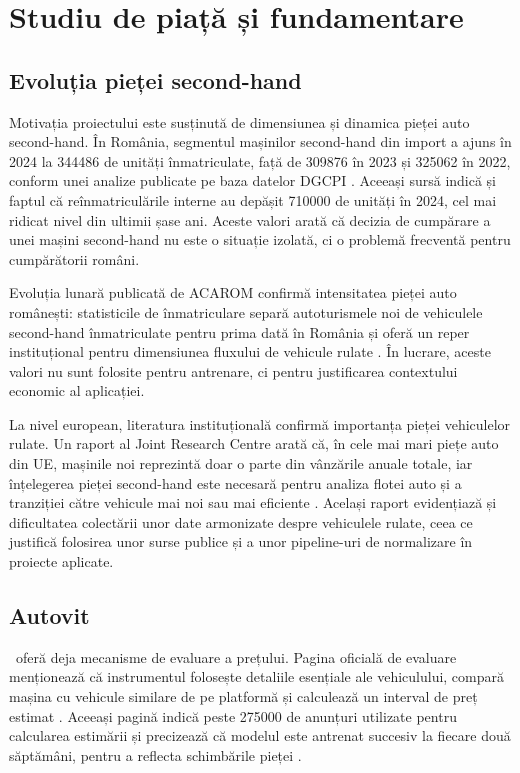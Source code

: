 \chapter{Studiu de piață și fundamentare}
\label{chapter:market}

\section{Evoluția pieței second-hand}
\label{sec:market-growth}

Motivația proiectului este susținută de dimensiunea și dinamica pieței auto second-hand. În România, segmentul mașinilor second-hand din import a ajuns în 2024 la 344486 de unități înmatriculate, față de 309876 în 2023 și 325062 în 2022, conform unei analize publicate pe baza datelor DGCPI \cite{revistabiz_auto_2024}. Aceeași sursă indică și faptul că reînmatriculările interne au depășit 710000 de unități în 2024, cel mai ridicat nivel din ultimii șase ani. Aceste valori arată că decizia de cumpărare a unei mașini second-hand nu este o situație izolată, ci o problemă frecventă pentru cumpărătorii români.

Evoluția lunară publicată de ACAROM confirmă intensitatea pieței auto românești: statisticile de înmatriculare separă autoturismele noi de vehiculele second-hand înmatriculate pentru prima dată în România și oferă un reper instituțional pentru dimensiunea fluxului de vehicule rulate \cite{acarom_martie_2024}. În lucrare, aceste valori nu sunt folosite pentru antrenare, ci pentru justificarea contextului economic al aplicației.

La nivel european, literatura instituțională confirmă importanța pieței vehiculelor rulate. Un raport al Joint Research Centre arată că, în cele mai mari piețe auto din UE, mașinile noi reprezintă doar o parte din vânzările anuale totale, iar înțelegerea pieței second-hand este necesară pentru analiza flotei auto și a tranziției către vehicule mai noi sau mai eficiente \cite{jrc_used_vehicle_market}. Același raport evidențiază și dificultatea colectării unor date armonizate despre vehiculele rulate, ceea ce justifică folosirea unor surse publice și a unor pipeline-uri de normalizare în proiecte aplicate.

\section{Autovit}
\label{sec:market-autovit}

\autovit\ oferă deja mecanisme de evaluare a prețului. Pagina oficială de evaluare menționează că instrumentul folosește detaliile esențiale ale vehiculului, compară mașina cu vehicule similare de pe platformă și calculează un interval de preț estimat \cite{autovit_evaluare}. Aceeași pagină indică peste 275000 de anunțuri utilizate pentru calcularea estimării și precizează că modelul este antrenat succesiv la fiecare două săptămâni, pentru a reflecta schimbările pieței \cite{autovit_evaluare}.

